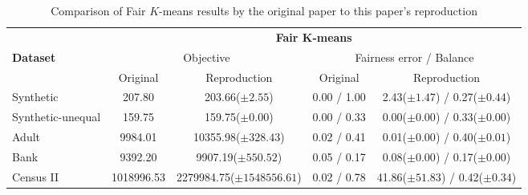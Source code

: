 \begin{table}[H]
    \centering
    \begin{tabular}{|l|c|c|c|c|}
        \hline
            & \multicolumn{4}{c|}{\textbf{Fair $\boldsymbol{K}$-means}} \\
            \cline{2-5}
        \textbf{Dataset} & \multicolumn{2}{c|}{Objective} &   \multicolumn{2}{c|}{Fairness error / Balance} \\ \cline{2-5}
        & Original & Reproduction & Original & Reproduction \\
        \hline
        Synthetic & 207.80 & 203.66($\pm 2.55$) & \color{red}0.00\color{black} / \color{red}1.00\color{black} & 2.43($\pm 1.47$) / 0.27($\pm 0.44$) \\
        Synthetic-unequal & 159.75 & 159.75($\pm 0.00$) & 0.00 / 0.33 & 0.00($\pm 0.00$) / 0.33($\pm 0.00$) \\
        Adult & \color{red}9984.01\color{black} & 10355.98($\pm 328.43$) & 0.02 / \color{red}0.41\color{black} & 0.01($\pm 0.00$) / 0.40($\pm 0.01$) \\
        Bank & \color{orange}9392.20\color{black} & 9907.19($\pm 550.52$) & \color{red}0.05\color{black} / 0.17 & 0.08($\pm 0.00$) / 0.17($\pm 0.00$) \\
        Census II & \color{orange}1018996.53\color{black} & 2279984.75($\pm 1548556.61$) & \color{orange}0.02\color{black} / \color{red}0.78\color{black} & 41.86($\pm 51.83$) / 0.42($\pm 0.34$) \\
        \hline
    \end{tabular}
    \caption{Comparison of Fair $K$-means results by the original paper to this paper's reproduction}
    \label{tab:comparison_originalVSreproduction_kmeans}
\end{table}

